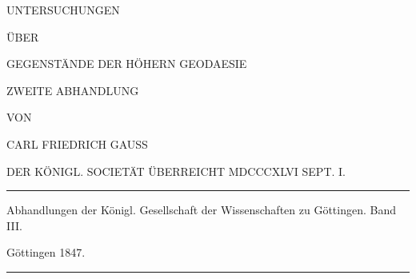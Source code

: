 \clearpage
{}
\thispagestyle{empty}
\vspace*{.3in}
\begin{center}
{\large UNTERSUCHUNGEN}\par\bigskip
ÜBER\par\bigskip
{\Large GEGENSTÄNDE DER HÖHERN GEODAESIE}\par\vspace{25pt}
ZWEITE ABHANDLUNG\par\vspace{35pt}
VON\par\vspace{35pt}
{\large CARL FRIEDRICH GAUSS}\par\vspace{35pt}
{\small DER KÖNIGL. SOCIETÄT ÜBERREICHT MDCCCXLVI SEPT. I.}
\end{center}
\vfill
\begin{center}
\rule{.8\linewidth}{.3pt}\par\smallskip
Abhandlungen der Königl. Gesellschaft der Wissenschaften zu Göttingen. Band III.\par
Göttingen 1847.\par\smallskip
\rule{.8\linewidth}{.3pt}
\end{center}
\clearpage

